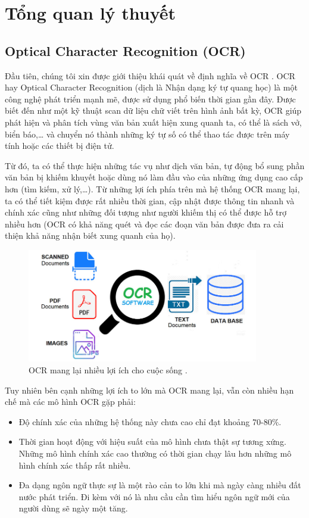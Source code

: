 \chapter{Tổng quan lý thuyết}
\label{Chapter2}

\section{Optical Character Recognition (OCR)}
Đầu tiên, chúng tôi xin được giới thiệu khái quát về định nghĩa về OCR \cite{impedovo1991optical}. OCR hay Optical Character Recognition (dịch là Nhận dạng ký tự quang học) là một công nghệ phát triển
mạnh mẽ, được sử dụng phổ biến thời gian gần đây. Được biết đến như một kỹ thuật scan
dữ liệu chữ viết trên hình ảnh bất kỳ, OCR giúp phát hiện và phân tích vùng văn bản xuất
hiện xung quanh ta, có thể là sách vở, biển báo,… và chuyển nó thành những ký tự số có
thể thao tác được trên máy tính hoặc các thiết bị điện tử.

Từ đó, ta có thể thực hiện những tác vụ như dịch văn bản, tự động bổ sung phần văn bản bị
khiếm khuyết hoặc dùng nó làm đầu vào của những ứng dụng cao cấp hơn (tìm kiếm, xử
lý,…). Từ những lợi ích phía trên mà hệ thống OCR mang lại, ta có thể tiết kiệm được rất
nhiều thời gian, cập nhật được thông tin nhanh và chính xác cũng như những đối tượng
như người khiếm thị có thể được hỗ trợ nhiều hơn (OCR có khả năng quét và đọc các đoạn
văn bản được đưa ra cải thiện khả năng nhận biết xung quanh của họ).

\begin{figure}
\centering
\includegraphics[width=0.9\textwidth]{mep_img/ocr-1.jpg}
\caption{OCR mang lại nhiều lợi ích cho cuộc sống \cite{ocr_intro}. }\label{fig_2.1}
\end{figure}

Tuy nhiên bên cạnh những lợi ích to lớn mà OCR mang lại, vẫn còn nhiều hạn chế mà các
mô hình OCR gặp phải:

\begin{itemize}
    \item Độ chính xác của những hệ thống này chưa cao chỉ đạt khoảng 70-80$\%$.
    \item Thời gian hoạt động với hiệu suất của mô hình chưa thật sự tương xứng. Những mô
hình chính xác cao thường có thời gian chạy lâu hơn những mô hình chính xác thấp
rất nhiều.
\item Đa dạng ngôn ngữ thực sự là một rào cản to lớn khi mà ngày càng nhiều đất nước
phát triển. Đi kèm với nó là nhu cầu cần tìm hiểu ngôn ngữ mới của người dùng sẽ ngày một tăng.
\end{itemize}

